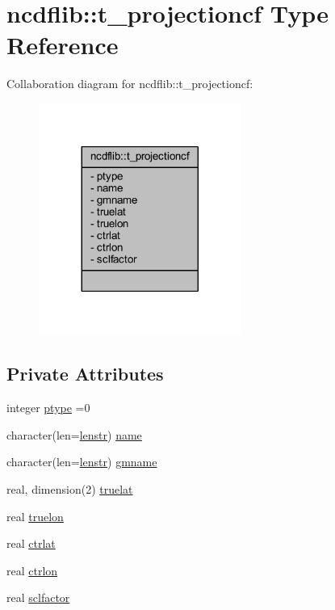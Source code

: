 \hypertarget{structncdflib_1_1t__projectioncf}{}\section{ncdflib\+:\+:t\+\_\+projectioncf Type Reference}
\label{structncdflib_1_1t__projectioncf}


Collaboration diagram for ncdflib\+:\+:t\+\_\+projectioncf\+:\nopagebreak
\begin{figure}[H]
\begin{center}
\leavevmode
\includegraphics[width=188pt]{structncdflib_1_1t__projectioncf__coll__graph}
\end{center}
\end{figure}
\subsection*{Private Attributes}
\begin{DoxyCompactItemize}
\item 
integer \mbox{\hyperlink{structncdflib_1_1t__projectioncf_a6e447441dfd169ef06770aabf1b296d3}{ptype}} =0
\item 
character(len=\mbox{\hyperlink{namespacencdflib_a7d52315e1d9f473093f6f8fa245ea084}{lenstr}}) \mbox{\hyperlink{structncdflib_1_1t__projectioncf_aa16a722af4c0a4f7fcb279e653927787}{name}}
\item 
character(len=\mbox{\hyperlink{namespacencdflib_a7d52315e1d9f473093f6f8fa245ea084}{lenstr}}) \mbox{\hyperlink{structncdflib_1_1t__projectioncf_affa62c1cc858dfa62279c03231023e2e}{gmname}}
\item 
real, dimension(2) \mbox{\hyperlink{structncdflib_1_1t__projectioncf_a19822feb15f72a9f94e9eae572bcb6b1}{truelat}}
\item 
real \mbox{\hyperlink{structncdflib_1_1t__projectioncf_a3a4c2ed39b41532000c84d2ecf1d7bf4}{truelon}}
\item 
real \mbox{\hyperlink{structncdflib_1_1t__projectioncf_abab9cedb4247886344b9d41338cc507c}{ctrlat}}
\item 
real \mbox{\hyperlink{structncdflib_1_1t__projectioncf_a867957c75b17b9df074f4097b73dae19}{ctrlon}}
\item 
real \mbox{\hyperlink{structncdflib_1_1t__projectioncf_a525406ed8bcf2160b8a02881d2ac03fa}{sclfactor}}
\end{DoxyCompactItemize}


